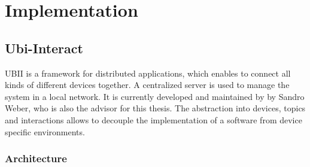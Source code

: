 \chapter{Implementation}\label{chapter:implementation}


\section{Ubi-Interact}\label{section:ubi-interact}

\ac{UBII} is a framework for distributed applications, which enables to connect all kinds of different devices together. A centralized server is used to manage the system in a local network. It is currently developed and maintained by by Sandro Weber, who is also the advisor for this thesis. The abstraction into devices, topics and interactions allows to decouple the implementation of a software from device specific environments.


\subsection{Architecture}\label{subsection:architecture}

